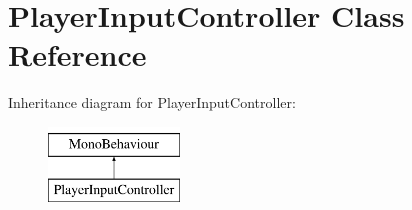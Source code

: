 \hypertarget{class_player_input_controller}{\section{Player\-Input\-Controller Class Reference}
\label{class_player_input_controller}
}
Inheritance diagram for Player\-Input\-Controller\-:\begin{figure}[H]
\begin{center}
\leavevmode
\includegraphics[height=2.000000cm]{class_player_input_controller}
\end{center}
\end{figure}
